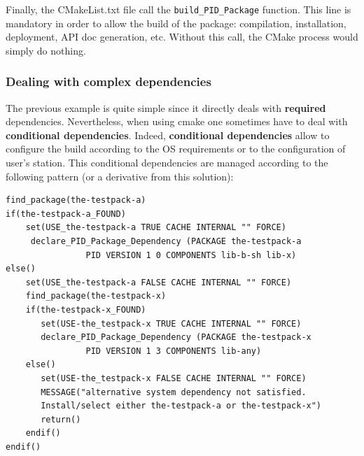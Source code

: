 \documentclass[12pt,a4paper]{article}
\begin{document}
Finally, the CMakeList.txt file call the \texttt{build\_PID\_Package} function. This line is mandatory in order to allow the build of the package: compilation, installation, deployment, API doc generation, etc. Without this call, the CMake process would simply do nothing.

\subsubsection{Dealing with complex dependencies}
\label{sec:rootCMakeComplexDeps}

The previous example is quite simple since it directly deals with \textbf{required} dependencies. Nevertheless, when using cmake one sometimes have to deal with \textbf{conditional dependencies}. Indeed, \textbf{conditional dependencies} allow to configure the build according to the OS requirements or to the configuration of user's station. This conditional dependencies are managed according to the following pattern (or a derivative from this solution):
\begin{verbatim}
find_package(the-testpack-a)
if(the-testpack-a_FOUND)
    set(USE_the-testpack-a TRUE CACHE INTERNAL "" FORCE)
     declare_PID_Package_Dependency (PACKAGE the-testpack-a
                PID VERSION 1 0 COMPONENTS lib-b-sh lib-x)
else()
    set(USE_the-testpack-a FALSE CACHE INTERNAL "" FORCE)
    find_package(the-testpack-x)
    if(the-testpack-x_FOUND)
       set(USE-the_testpack-x TRUE CACHE INTERNAL "" FORCE)
       declare_PID_Package_Dependency (PACKAGE the-testpack-x
                PID VERSION 1 3 COMPONENTS lib-any)
    else()
       set(USE-the_testpack-x FALSE CACHE INTERNAL "" FORCE)
       MESSAGE("alternative system dependency not satisfied. 
       Install/select either the-testpack-a or the-testpack-x")
       return()       
    endif()
endif()
\end{verbatim}
\end{document}
